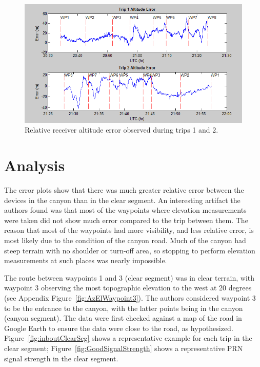 \documentclass[]{aiaa-tc}%
\begin{document}
	\begin{figure}[H]
		\centering
		\includegraphics[width = 13cm]{AltitudeErr.PNG}
		\caption{Relative receiver altitude error observed during trips 1 and 2.}
		\label{fig:AltitudeErr}
	\end{figure}
	
	\section{Analysis}
	
	\noindent The error plots show that there was much greater relative error between the devices in the canyon than in the clear segment. An interesting artifact the authors found was that most of the waypoints where elevation measurements were taken did not show much error compared to the trip between them. The reason that most of the waypoints had more visibility, and less relative error, is most likely due to the condition of the canyon road. Much of the canyon had steep terrain with no shoulder or turn-off area, so stopping to perform elevation measurements at such places was nearly impossible.
		
	\vspace{5 mm}

	\noindent The route between waypoints 1 and 3 (clear segment) was in clear terrain, with waypoint 3 observing the most topographic elevation to the west at 20 degrees (see Appendix Figure~\ref{fig:AzElWaypoint3}). The authors considered waypoint 3 to be the entrance to the canyon, with the latter points being in the canyon (canyon segment). The data were first checked against a map of the road in Google Earth to ensure the data were close to the road, as hypothesized. Figure~\ref{fig:inboutClearSeg} shows a representative example for each trip in the clear segment; Figure~\ref{fig:GoodSignalStrength} shows a representative PRN signal strength in the clear segment.
	
\end{document}
